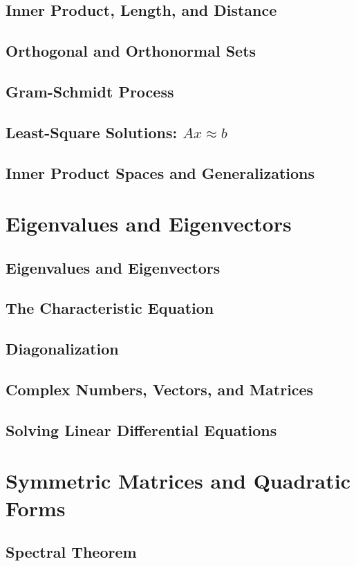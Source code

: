 \documentclass[11pt]{article}
\begin{document}
\subsection{Inner Product, Length, and Distance}
\subsection{Orthogonal and Orthonormal Sets}
\subsection{Gram-Schmidt Process}
\subsection{Least-Square Solutions: $Ax\approx b$}
\subsection{Inner Product Spaces and Generalizations}

\section{Eigenvalues and Eigenvectors}
\subsection{Eigenvalues and Eigenvectors}
\subsection{The Characteristic Equation}
\subsection{Diagonalization}
\subsection{Complex Numbers, Vectors, and Matrices}
\subsection{Solving Linear Differential Equations}

\section{Symmetric Matrices and Quadratic Forms}
\subsection{Spectral Theorem}
\end{document}
